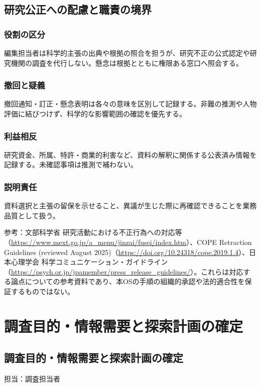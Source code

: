 \documentclass[a4paper,11pt]{article}
\begin{document}
\subsection{研究公正への配慮と職責の境界}
\subsubsection{役割の区分}
\par 編集担当者は科学的主張の出典や根拠の照合を担うが、研究不正の公式認定や研究機関の調査を代行しない。懸念は根拠とともに権限ある窓口へ照会する。\par\medskip
\subsubsection{撤回と疑義}
\par 撤回通知・訂正・懸念表明は各々の意味を区別して記録する。非難の推測や人物評価に結びつけず、科学的な影響範囲の確認を優先する。\par\medskip
\subsubsection{利益相反}
\par 研究資金、所属、特許・商業的利害など、資料の解釈に関係する公表済み情報を記録する。未確認事項は推測で補わない。\par\medskip
\subsubsection{説明責任}
\par 資料選択と主張の留保を示せること、異議が生じた際に再確認できることを業務品質として扱う。\par\medskip
\par 参考：文部科学省 研究活動における不正行為への対応等（\url{https://www.mext.go.jp/a_menu/jinzai/fusei/index.htm}）、COPE Retraction Guidelines (reviewed August 2025)（\url{https://doi.org/10.24318/cope.2019.1.4}）、日本心理学会 科学コミュニケーション・ガイドライン（\url{https://psych.or.jp/jpamember/press_release_guidelines/}）。これらは対応する論点についての参考資料であり、本OSの手順の組織的承認や法的適合性を保証するものではない。\par\medskip
\section{調査目的・情報需要と探索計画の確定}
\subsection{調査目的・情報需要と探索計画の確定}
\par 担当：調査担当者\par\medskip
\end{document}
